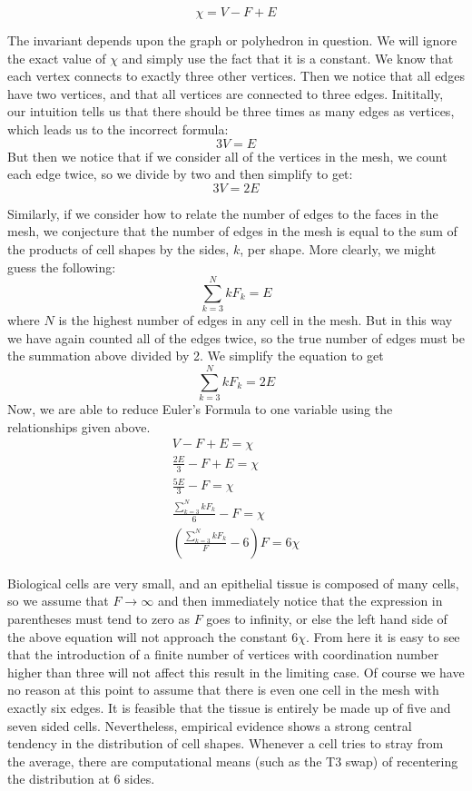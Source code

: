 \begin{equation}
\chi = V - F + E
\end{equation}

The invariant depends upon the graph or polyhedron in question. We will ignore the exact value of $\chi$ and simply use the fact that it is a constant. We know that each vertex connects to exactly three other vertices. Then we notice that all edges have two vertices, and that all vertices are connected to three edges. Inititally, our intuition tells us that there should be three times as many edges as vertices, which leads us to the incorrect formula:
\begin{equation}
3V = E
\end{equation}
But then we notice that if we consider all of the vertices in the mesh, we count each edge twice, so we divide by two and then simplify to get:
\begin{equation}
3V = 2E
\end{equation}

Similarly, if we consider how to relate the number of edges to the faces in the mesh, we conjecture that the number of edges in the mesh is equal to the sum of the products of cell shapes by the sides, $k$,  per shape. More clearly, we might guess the following:
\begin{equation}
\sum_{k=3}^N kF_k = E
\end{equation}
where $N$ is the highest number of edges in any cell in the mesh. But in this way we have again counted all of the edges twice, so the true number of edges must be the summation above divided by 2. We simplify the equation to get
\begin{equation}
\sum_{k=3}^N kF_k = 2E
\end{equation}
Now, we are able to reduce Euler's Formula to one variable using the relationships given above.
\begin{gather}
V - F + E = \chi\\
\frac{2E}3 - F + E = \chi\\
\frac{5E}3 - F = \chi\\
\frac{\sum_{k=3}^N kF_k}{6} - F = \chi\\
(\frac{\sum_{k=3}^N kF_k}{F} - 6)F = 6\chi
\end{gather}

Biological cells are very small, and an epithelial tissue is composed of many cells, so we assume that $F\to\infty$ and then immediately notice that the expression in parentheses must tend to zero as $F$ goes to infinity, or else the left hand side of the above equation will not approach the constant $6\chi$. From here it is easy to see that the introduction of a finite number of vertices with coordination number higher than three will not affect this result in the limiting case. Of course we have no reason at this point to assume that there is even one cell in the mesh with exactly six edges. It is feasible that the tissue is entirely be made up of five and seven sided cells. Nevertheless, empirical evidence shows a strong central tendency in the distribution of cell shapes. Whenever a cell tries to stray from the average, there are computational means (such as the T3 swap) of recentering the distribution at 6 sides.

